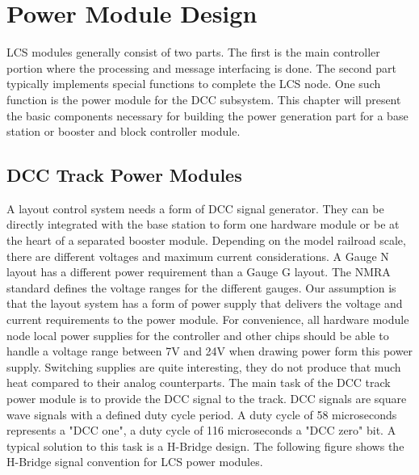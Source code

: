 \chapter{Power Module Design}

LCS modules generally consist of two parts. The first is the main controller portion where the processing and message interfacing is done. The second part typically implements special functions to complete the LCS node. One such function is the power module for the DCC subsystem. This chapter will present the basic components necessary for building the power generation part for a base station or booster and block controller module.

\section{DCC Track Power Modules}

A layout control system needs a form of DCC signal generator. They can be directly integrated with the base station to form one hardware module or be at the heart of a separated booster module. Depending on the model railroad scale, there are different voltages and maximum current considerations. A Gauge N layout has a different power requirement than a Gauge G layout. The NMRA standard defines the voltage ranges for the different gauges. Our assumption is that the layout system has a form of power supply that delivers the voltage and current requirements to the power module. For convenience, all hardware module node local power supplies for the controller and other chips should be able to handle a voltage range between 7V and 24V when drawing power form this power supply. Switching supplies are quite interesting, they do not produce that much heat compared to their analog counterparts. The main task of the DCC track power module is to provide the DCC signal to the track. DCC signals are square wave signals with a defined duty cycle period. A duty cycle of 58 microseconds represents a "DCC one", a duty cycle of 116 microseconds a "DCC zero" bit. A typical solution to this task is a H-Bridge design. The following figure shows the H-Bridge signal convention for LCS power modules.


